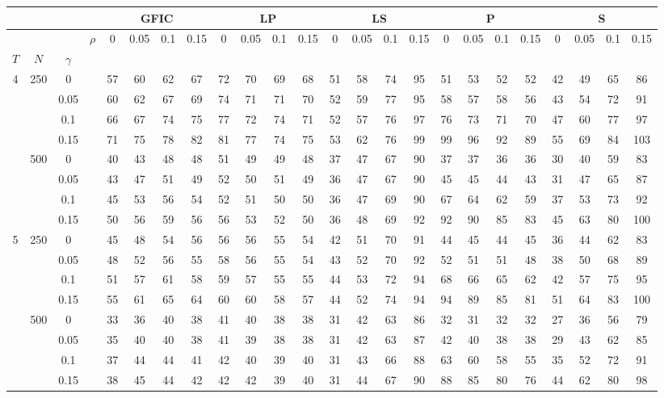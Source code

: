 \begin{tabular}{cccc|cccc|cccc|cccc|cccc|cccc} 
 \hline \hline 
\multicolumn{4}{c}{}&\multicolumn{4}{c}{GFIC}&\multicolumn{4}{c}{LP}&\multicolumn{4}{c}{LS}&\multicolumn{4}{c}{P}&\multicolumn{4}{c}{S}\\ 
 \hline
 &  &  & $\rho$ & 0 & 0.05 & 0.1 & 0.15 & 0 & 0.05 & 0.1 & 0.15 & 0 & 0.05 & 0.1 & 0.15 & 0 & 0.05 & 0.1 & 0.15 & 0 & 0.05 & 0.1 & 0.15 \\
$T$ & $N$ & $\gamma$ &  &  &  &  &  &  &  &  &  &  &  &  &  &  &  &  &  &  &  &  &  \\
4 & 250 & 0 &  & 57 & 60 & 62 & 67 & 72 & 70 & 69 & 68 & 51 & 58 & 74 & 95 & 51 & 53 & 52 & 52 & 42 & 49 & 65 & 86 \\
 &  & 0.05 &  & 60 & 62 & 67 & 69 & 74 & 71 & 71 & 70 & 52 & 59 & 77 & 95 & 58 & 57 & 58 & 56 & 43 & 54 & 72 & 91 \\
 &  & 0.1 &  & 66 & 67 & 74 & 75 & 77 & 72 & 74 & 71 & 52 & 57 & 76 & 97 & 76 & 73 & 71 & 70 & 47 & 60 & 77 & 97 \\
 &  & 0.15 &  & 71 & 75 & 78 & 82 & 81 & 77 & 74 & 75 & 53 & 62 & 76 & 99 & 99 & 96 & 92 & 89 & 55 & 69 & 84 & 103 \\
 & 500 & 0 &  & 40 & 43 & 48 & 48 & 51 & 49 & 49 & 48 & 37 & 47 & 67 & 90 & 37 & 37 & 36 & 36 & 30 & 40 & 59 & 83 \\
 &  & 0.05 &  & 43 & 47 & 51 & 49 & 52 & 50 & 51 & 49 & 36 & 47 & 67 & 90 & 45 & 45 & 44 & 43 & 31 & 47 & 65 & 87 \\
 &  & 0.1 &  & 45 & 53 & 56 & 54 & 52 & 51 & 50 & 50 & 36 & 47 & 69 & 90 & 67 & 64 & 62 & 59 & 37 & 53 & 73 & 92 \\
 &  & 0.15 &  & 50 & 56 & 59 & 56 & 56 & 53 & 52 & 50 & 36 & 48 & 69 & 92 & 92 & 90 & 85 & 83 & 45 & 63 & 80 & 100 \\
5 & 250 & 0 &  & 45 & 48 & 54 & 56 & 56 & 56 & 55 & 54 & 42 & 51 & 70 & 91 & 44 & 45 & 44 & 45 & 36 & 44 & 62 & 83 \\
 &  & 0.05 &  & 48 & 52 & 56 & 55 & 58 & 56 & 55 & 54 & 43 & 52 & 70 & 92 & 52 & 51 & 51 & 48 & 38 & 50 & 68 & 89 \\
 &  & 0.1 &  & 51 & 57 & 61 & 58 & 59 & 57 & 55 & 55 & 44 & 53 & 72 & 94 & 68 & 66 & 65 & 62 & 42 & 57 & 75 & 95 \\
 &  & 0.15 &  & 55 & 61 & 65 & 64 & 60 & 60 & 58 & 57 & 44 & 52 & 74 & 94 & 94 & 89 & 85 & 81 & 51 & 64 & 83 & 100 \\
 & 500 & 0 &  & 33 & 36 & 40 & 38 & 41 & 40 & 38 & 38 & 31 & 42 & 63 & 86 & 32 & 31 & 32 & 32 & 27 & 36 & 56 & 79 \\
 &  & 0.05 &  & 35 & 40 & 40 & 38 & 41 & 39 & 38 & 38 & 31 & 42 & 63 & 87 & 42 & 40 & 38 & 38 & 29 & 43 & 62 & 85 \\
 &  & 0.1 &  & 37 & 44 & 44 & 41 & 42 & 40 & 39 & 40 & 31 & 43 & 66 & 88 & 63 & 60 & 58 & 55 & 35 & 52 & 72 & 91 \\
 &  & 0.15 &  & 38 & 45 & 44 & 42 & 42 & 42 & 39 & 40 & 31 & 44 & 67 & 90 & 88 & 85 & 80 & 76 & 44 & 62 & 80 & 98 \\
\hline
\end{tabular}